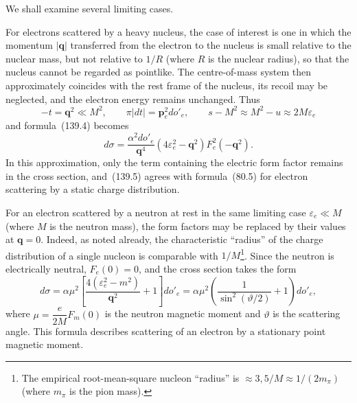 We shall examine several limiting cases.

For electrons scattered by a heavy nucleus, the case of interest is one in which the momentum $|\mathbf q|$ transferred from the electron to the nucleus is small relative to the nuclear mass, but not relative to $1/R$ (where $R$ is the nuclear radius), so that the nucleus cannot be regarded as pointlike. The centre-of-mass system then approximately coincides with the rest frame of the nucleus, its recoil may be neglected, and the electron energy remains unchanged. Thus
\[
-t=\mathbf q^2\ll M^2,\qquad \pi|dt|=\mathbf p_e^2do'_e,\qquad s-M^2\approx M^2-u\approx2M\varepsilon_e
\]
and formula~(139.4) becomes
\begin{equation}
d\sigma=\frac{\alpha^2do'_e}{\mathbf q^4}(4\varepsilon_e^2-\mathbf q^2)F_e^2(-\mathbf q^2).
\tag{139.5}
\end{equation}
In this approximation, only the term containing the electric form factor remains in the cross section, and~(139.5) agrees with formula~(80.5) for electron scattering by a static charge distribution.

For an electron scattered by a neutron at rest in the same limiting case $\varepsilon_e\ll M$ (where $M$ is the neutron mass), the form factors may be replaced by their values at $\mathbf q=0$. Indeed, as noted already, the characteristic ``radius'' of the charge distribution of a single nucleon is comparable with $1/M$\footnote{The empirical root-mean-square nucleon ``radius'' is $\approx3{,}5/M\approx1/(2m_\pi)$ (where $m_\pi$ is the pion mass).}. Since the neutron is electrically neutral, $F_e(0)=0$, and the cross section takes the form
\begin{equation}
d\sigma=\alpha\mu^2\left[\frac{4(\varepsilon_e^2-m^2)}{\mathbf q^2}+1\right]do'_e
=\alpha\mu^2\left(\frac{1}{\sin^2(\vartheta/2)}+1\right)do'_e,
\tag{139.6}
\end{equation}
where $\mu=\dfrac{e}{2M}F_m(0)$ is the neutron magnetic moment and $\vartheta$ is the scattering angle. This formula describes scattering of an electron by a stationary point magnetic moment.

